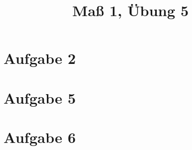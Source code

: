 \documentclass[]{article}
\author{}
\title{Maß 1, Übung 5}
\begin{document}
    \begin{titlepage}
        \maketitle
    \end{titlepage}
    
    \section{Aufgabe 2}
    
    \section{Aufgabe 5}
    
    \section{Aufgabe 6}
    

    
    
\end{document}
